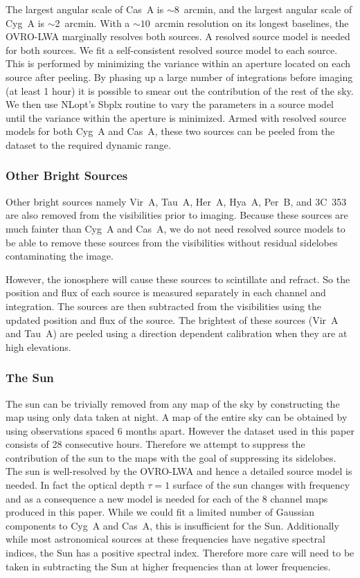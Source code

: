 \documentclass[twocolumn]{aastex61}
\begin{document}
The largest angular scale of Cas~A is $\sim$8~arcmin, and the largest angular scale of Cyg~A is
$\sim$2~arcmin. With a $\sim10$~arcmin resolution on its longest baselines, the OVRO-LWA marginally
resolves both sources. A resolved source model is needed for both sources. We fit a self-consistent
resolved source model to each source. This is performed by minimizing the variance within an
aperture located on each source after peeling. By phasing up a large number of integrations before
imaging (at least 1 hour) it is possible to smear out the contribution of the rest of the sky.  We
then use NLopt's Sbplx routine \citep{nlopt, sbplx} to vary the parameters in a source model until
the variance within the aperture is minimized.  Armed with resolved source models for both Cyg~A and
Cas~A, these two sources can be peeled from the dataset to the required dynamic range.

\subsubsection{Other Bright Sources}

Other bright sources namely Vir~A, Tau~A, Her~A, Hya~A, Per~B, and 3C~353 are also removed from
the visibilities prior to imaging. Because these sources are much fainter than Cyg~A and Cas~A, we
do not need resolved source models to be able to remove these sources from the visibilities without
residual sidelobes contaminating the image.

However, the ionosphere will cause these sources to scintillate and refract. So the position and
flux of each source is measured separately in each channel and integration. The sources are then
subtracted from the visibilities using the updated position and flux of the source. The brightest of
these sources (Vir~A and Tau~A) are peeled using a direction dependent calibration when they are
at high elevations.

\subsubsection{The Sun}

The sun can be trivially removed from any map of the sky by constructing the map using only data
taken at night. A map of the entire sky can be obtained by using observations spaced 6 months apart.
However the dataset used in this paper consists of 28 consecutive hours. Therefore we attempt to
suppress the contribution of the sun to the maps with the goal of suppressing its sidelobes.  The
sun is well-resolved by the OVRO-LWA and hence a detailed source model is needed. In fact the
optical depth $\tau=1$ surface of the sun changes with frequency and as a consequence a new model is
needed for each of the 8 channel maps produced in this paper. While we could fit a limited number of
Gaussian components to Cyg~A and Cas~A, this is insufficient for the Sun.  Additionally while most
astronomical sources at these frequencies have negative spectral indices, the Sun has a positive
spectral index. Therefore more care will need to be taken in subtracting the Sun at higher
frequencies than at lower frequencies.
\end{document}
